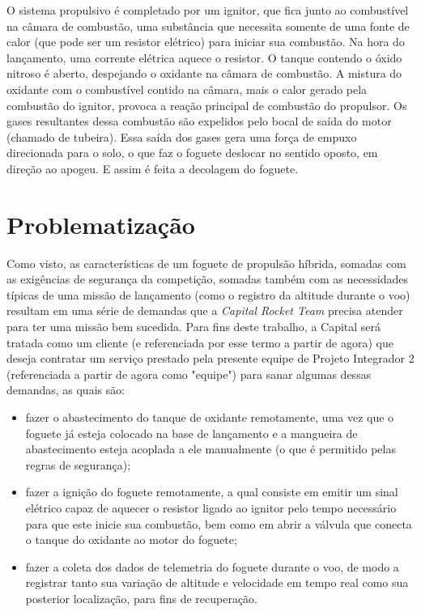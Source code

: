 \par O sistema propulsivo é completado por um ignitor, que fica junto ao combustível na câmara de combustão, uma substância que necessita somente de uma fonte de calor (que pode ser um resistor elétrico) para iniciar sua combustão. Na hora do lançamento, uma corrente elétrica aquece o resistor. O tanque contendo o óxido nitroso é aberto, despejando o oxidante na câmara de combustão. A mistura do oxidante com o combustível contido na câmara, mais o calor gerado pela combustão do ignitor, provoca a reação principal de combustão do propulsor. Os gases resultantes dessa combustão são expelidos pelo bocal de saída do motor (chamado de tubeira). Essa saída dos gases gera uma força de empuxo direcionada para o solo, o que faz o foguete deslocar no sentido oposto, em direção ao apogeu. E assim é feita a decolagem do foguete.

\section{Problematização}

\par Como visto, as características de um foguete de propulsão híbrida, somadas com as exigências de segurança da competição, somadas também com as necessidades típicas de uma missão de lançamento (como o registro da altitude durante o voo) resultam em uma série de demandas que a \textit{Capital Rocket Team} precisa atender para ter uma missão bem sucedida. Para fins deste trabalho, a Capital será tratada como um cliente (e referenciada por esse termo a partir de agora) que deseja contratar um serviço prestado pela presente equipe de Projeto Integrador 2 (referenciada a partir de agora como "equipe") para sanar algumas dessas demandas, as quais são:

\begin{itemize}
    \item fazer o abastecimento do tanque de oxidante remotamente, uma vez que o foguete já esteja colocado na base de lançamento e a mangueira de abastecimento esteja acoplada a ele manualmente (o que é permitido pelas regras de segurança);
    \item fazer a ignição do foguete remotamente, a qual consiste em emitir um sinal elétrico capaz de aquecer o resistor ligado ao ignitor pelo tempo necessário para que este inicie sua combustão, bem como em abrir a válvula que conecta o tanque do oxidante ao motor do foguete;
    \item fazer a coleta dos dados de telemetria do foguete durante o voo, de modo a registrar tanto sua variação de altitude e velocidade em tempo real como sua posterior localização, para fins de recuperação.
\end{itemize}

